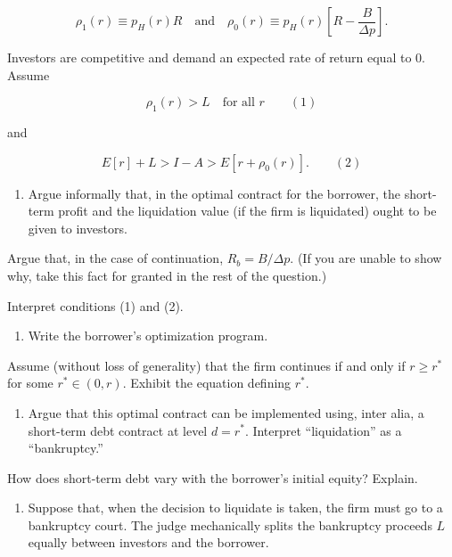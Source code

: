 \documentclass[11pt,a4paper]{article}
\providecommand{\tightlist}{\setlength{\itemsep}{0pt}\setlength{\parskip}{0pt}}
\begin{document}
\[\rho_1(r) \equiv p_H(r)R \quad \text{and} \quad \rho_0(r) \equiv p_H(r)\left[R - \frac{B}{\Delta p}\right].\]

Investors are competitive and demand an expected rate of return equal to 0. Assume

\[\rho_1(r) > L \quad \text{for all } r \qquad (1)\]

and

\[E[r] + L > I - A > E[r + \rho_0(r)]. \qquad (2)\]

\begin{enumerate}
\def\labelenumi{(\roman{enumi})}
\tightlist
\item
  Argue informally that, in the optimal contract for the borrower, the short-term profit and the
  liquidation value (if the firm is liquidated) ought to be given to investors.
\end{enumerate}

Argue that, in the case of continuation, \(R_b = B/\Delta p\). (If you are unable to show why, take
this fact for granted in the rest of the question.)

Interpret conditions (1) and (2).

\begin{enumerate}
\def\labelenumi{(\roman{enumi})}
\setcounter{enumi}{1}
\tightlist
\item
  Write the borrower's optimization program.
\end{enumerate}

Assume (without loss of generality) that the firm continues if and only if \(r \geqslant r^*\) for
some \(r^* \in (0, r)\). Exhibit the equation defining \(r^*\).

\begin{enumerate}
\def\labelenumi{(\roman{enumi})}
\setcounter{enumi}{2}
\tightlist
\item
  Argue that this optimal contract can be implemented using, inter alia, a short-term debt contract
  at level \(d = r^*\). Interpret ``liquidation'' as a ``bankruptcy.''
\end{enumerate}

How does short-term debt vary with the borrower's initial equity? Explain.

\begin{enumerate}
\def\labelenumi{(\roman{enumi})}
\setcounter{enumi}{3}
\tightlist
\item
  Suppose that, when the decision to liquidate is taken, the firm must go to a bankruptcy court. The
  judge mechanically splits the bankruptcy proceeds \(L\) equally between investors and the
  borrower.
\end{enumerate}
\end{document}
